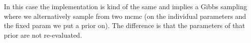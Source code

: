 \documentclass[a4paper]{article}
\begin{document}
In this case the implementation is kind of the same and implies a Gibbs sampling where we alternatively sample from two mcmc (on the individual parameters and the fixed param we put a prior on). The difference is that the parameters of that prior are not re-evaluated.







\newpage
\end{document}
